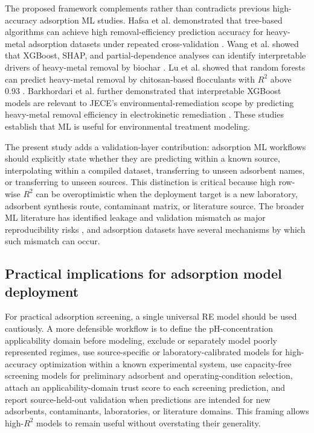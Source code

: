 \documentclass[review,12pt,number]{elsarticle}
\begin{document}
The proposed framework complements rather than contradicts previous high-accuracy adsorption ML studies. Hafsa et al. demonstrated that tree-based algorithms can achieve high removal-efficiency prediction accuracy for heavy-metal adsorption datasets under repeated cross-validation \cite{hafsa2020}. Wang et al. showed that XGBoost, SHAP, and partial-dependence analyses can identify interpretable drivers of heavy-metal removal by biochar \cite{wang2024}. Lu et al. showed that random forests can predict heavy-metal removal by chitosan-based flocculants with $R^2$ above 0.93 \cite{lu2022}. Barkhordari et al. further demonstrated that interpretable XGBoost models are relevant to JECE's environmental-remediation scope by predicting heavy-metal removal efficiency in electrokinetic remediation \cite{barkhordari2024}. These studies establish that ML is useful for environmental treatment modeling.

The present study adds a validation-layer contribution: adsorption ML workflows should explicitly state whether they are predicting within a known source, interpolating within a compiled dataset, transferring to unseen adsorbent names, or transferring to unseen sources. This distinction is critical because high row-wise $R^2$ can be overoptimistic when the deployment target is a new laboratory, adsorbent synthesis route, contaminant matrix, or literature source. The broader ML literature has identified leakage and validation mismatch as major reproducibility risks \cite{kapoor2023,zhu2023}, and adsorption datasets have several mechanisms by which such mismatch can occur.

\subsection{Practical implications for adsorption model deployment}

For practical adsorption screening, a single universal RE model should be used cautiously. A more defensible workflow is to define the pH-concentration applicability domain before modeling, exclude or separately model poorly represented regimes, use source-specific or laboratory-calibrated models for high-accuracy optimization within a known experimental system, use capacity-free screening models for preliminary adsorbent and operating-condition selection, attach an applicability-domain trust score to each screening prediction, and report source-held-out validation when predictions are intended for new adsorbents, contaminants, laboratories, or literature domains. This framing allows high-$R^2$ models to remain useful without overstating their generality.
\end{document}
